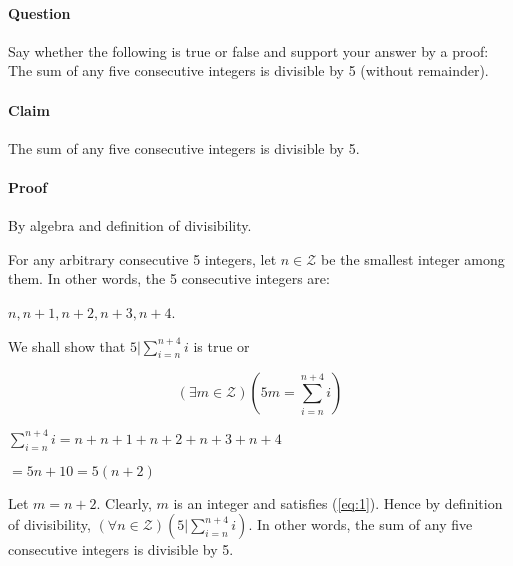 \documentclass[14pt]{extarticle}
\begin{document}
	\paragraph{Question}
	Say whether the following is true or false and support your answer by a proof: The sum of any five consecutive integers is divisible by 5 (without remainder).
	\paragraph{Claim} The sum of any five consecutive integers is divisible by 5.
	\paragraph{Proof} By algebra and definition of divisibility.
	\par\bigskip
	For any arbitrary consecutive 5 integers, let $n \in \mathcal{Z}$ be the smallest integer among them.  In other words, the 5 consecutive integers are:
	\begin{center} $n, n+1, n+2, n+3, n+4$. 
	\end{center}
	\par
	We shall show that $5|\sum\limits_{i=n}^{n+4} i$ is true or
	\par\begin{equation}\label{eq:1}
	(\exists m \in \mathcal{Z}) (5m = \sum\limits_{i=n}^{n+4} i)
	\end{equation}
	\par\bigskip\begin{center}
	$\sum\limits_{i=n}^{n+4} i= n+n+1+n+2+n+3+n+4$\par
	$=5n+10=5(n+2)$
	\end{center}
	\par\bigskip
	Let $m = n+2$.  Clearly, $m$ is an integer and satisfies (\ref{eq:1}).  Hence by definition of divisibility, $(\forall n \in \mathcal{Z})(5|\sum\limits_{i=n}^{n+4}i)$.
	In other words, the sum of any five consecutive integers is divisible by 5.
	
\end{document}
